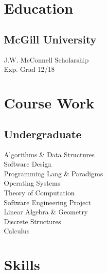 \documentclass[]{allanwang-resume}
\begin{document}
\header

\begin{minipage}[t][][b]{0.33\textwidth}~

	~\\


	\section{Education}
	\subsection{McGill University}
	J.W. McConnell Scholarship \\
	Exp. Grad 12/18
	\sectionsep

	\section{Course Work}
	\subsection{Undergraduate}
	Algorithms \& Data Structures \\
	Software Design \\
	Programming Lang \& Paradigms \\
	Operating Systems \\
	Theory of Computation \\
	Software Engineering Project \\
	Linear Algebra \& Geometry \\
	Discrete Structures \\
	Calculus \\
	\sectionsep

	\section{Skills}

\end{minipage}
\end{document}
